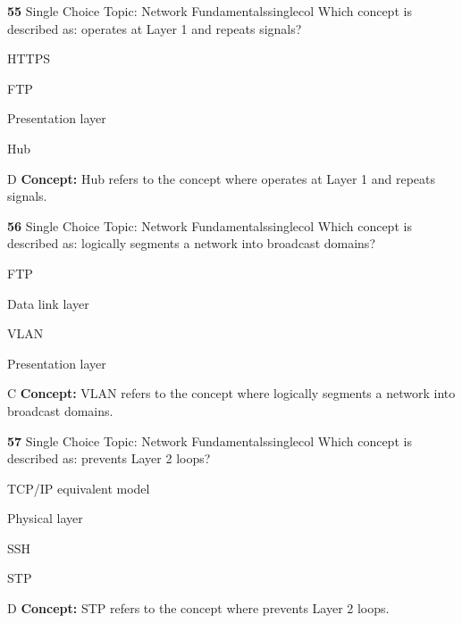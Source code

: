 \documentclass[10pt,a4paper]{article}
\begin{document}
\begin{qcard}{\color{white}\textbf{55} \hfill \small Single Choice \textbar{} Topic: Network Fundamentals}{singlecol}
Which concept is described as: operates at Layer 1 and repeats signals?

\begin{qoptions}
\item HTTPS
\item FTP
\item Presentation layer
\item Hub
\end{qoptions}
\begin{explainbox}{D}
\textbf{Concept:} Hub refers to the concept where operates at Layer 1 and repeats signals.
\end{explainbox}
\end{qcard}

\begin{qcard}{\color{white}\textbf{56} \hfill \small Single Choice \textbar{} Topic: Network Fundamentals}{singlecol}
Which concept is described as: logically segments a network into broadcast domains?

\begin{qoptions}
\item FTP
\item Data link layer
\item VLAN
\item Presentation layer
\end{qoptions}
\begin{explainbox}{C}
\textbf{Concept:} VLAN refers to the concept where logically segments a network into broadcast domains.
\end{explainbox}
\end{qcard}

\begin{qcard}{\color{white}\textbf{57} \hfill \small Single Choice \textbar{} Topic: Network Fundamentals}{singlecol}
Which concept is described as: prevents Layer 2 loops?

\begin{qoptions}
\item TCP/IP equivalent model
\item Physical layer
\item SSH
\item STP
\end{qoptions}
\begin{explainbox}{D}
\textbf{Concept:} STP refers to the concept where prevents Layer 2 loops.
\end{explainbox}
\end{qcard}
\end{document}
